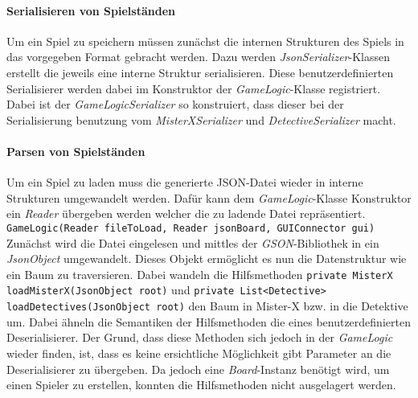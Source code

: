             \paragraph{Serialisieren von Spielständen}
                Um ein Spiel zu speichern müssen zunächst die internen Strukturen des Spiels in das vorgegeben Format gebracht werden.
                Dazu werden \textit{JsonSerializer}-Klassen erstellt die jeweils eine interne Struktur serialisieren.
                Diese benutzerdefinierten Serialisierer werden dabei im Konstruktor der \textit{GameLogic}-Klasse registriert.
                Dabei ist der \textit{GameLogicSerializer} so konstruiert,
                dass dieser bei der Serialisierung benutzung vom \textit{MisterXSerializer} und \textit{DetectiveSerializer} macht. 
            \paragraph{Parsen von Spielständen}
                Um ein Spiel zu laden muss die generierte JSON-Datei wieder in interne Strukturen umgewandelt werden.
                Dafür kann dem \textit{GameLogic}-Klasse Konstruktor ein \textit{Reader} übergeben werden welcher die
                zu ladende Datei repräsentiert.
                \newline
                \newline
                \texttt{GameLogic(Reader fileToLoad, Reader jsonBoard, GUIConnector gui)}
                \newline
                \newline
                Zunächst wird die Datei eingelesen und mittles der \textit{GSON}-Bibliothek in ein \textit{JsonObject} umgewandelt.
                Dieses Objekt ermöglicht es nun die Datenstruktur wie ein Baum zu traversieren.
                Dabei wandeln die Hilfsmethoden
                \newline
                \newline
                \texttt{private MisterX loadMisterX(JsonObject root)}
                \newline
                und 
                \newline
                \texttt{private List<Detective> loadDetectives(JsonObject root)}
                \newline
                \newline
                den Baum in Mister-X bzw. in die Detektive um.
                Dabei ähneln die Semantiken der Hilfsmethoden die eines benutzerdefinierten Deserialisierer.
                Der Grund, dass diese Methoden sich jedoch in der \textit{GameLogic} wieder finden, ist, dass es keine ersichtliche Möglichkeit gibt
                Parameter an die Deserialisierer zu übergeben.
                Da jedoch eine \textit{Board}-Instanz benötigt wird, um einen Spieler zu erstellen, konnten die Hilfsmethoden nicht ausgelagert werden.

